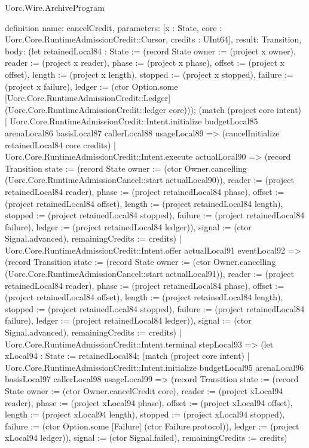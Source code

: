 \begin{lexlean}{Uorc.Wire.ArchiveProgram}
\begin{semanticmodule}
definition{
  name: cancelCredit,
  parameters: [x : State, core : Uorc.Core.RuntimeAdmissionCredit::Cursor, credits : UInt64],
  result: Transition,
  body: (let retainedLocal84 : State := (record State {owner := (project x owner), reader := (project x reader), phase := (project x phase), offset := (project x offset), length := (project x length), stopped := (project x stopped), failure := (project x failure), ledger := (ctor Option.some [Uorc.Core.RuntimeAdmissionCredit::Ledger] (Uorc.Core.RuntimeAdmissionCredit::ledger core))}); (match (project core intent)
    | Uorc.Core.RuntimeAdmissionCredit::Intent.initialize budgetLocal85 arenaLocal86 basisLocal87 callerLocal88 usageLocal89 => (cancelInitialize retainedLocal84 core credits)
    | Uorc.Core.RuntimeAdmissionCredit::Intent.execute actualLocal90 => (record Transition {state := (record State {owner := (ctor Owner.cancelling (Uorc.Core.RuntimeAdmissionCancel::start actualLocal90)), reader := (project retainedLocal84 reader), phase := (project retainedLocal84 phase), offset := (project retainedLocal84 offset), length := (project retainedLocal84 length), stopped := (project retainedLocal84 stopped), failure := (project retainedLocal84 failure), ledger := (project retainedLocal84 ledger)}), signal := (ctor Signal.advanced), remainingCredits := credits})
    | Uorc.Core.RuntimeAdmissionCredit::Intent.offer actualLocal91 eventLocal92 => (record Transition {state := (record State {owner := (ctor Owner.cancelling (Uorc.Core.RuntimeAdmissionCancel::start actualLocal91)), reader := (project retainedLocal84 reader), phase := (project retainedLocal84 phase), offset := (project retainedLocal84 offset), length := (project retainedLocal84 length), stopped := (project retainedLocal84 stopped), failure := (project retainedLocal84 failure), ledger := (project retainedLocal84 ledger)}), signal := (ctor Signal.advanced), remainingCredits := credits})
    | Uorc.Core.RuntimeAdmissionCredit::Intent.terminal stepLocal93 => (let xLocal94 : State := retainedLocal84; (match (project core intent)
      | Uorc.Core.RuntimeAdmissionCredit::Intent.initialize budgetLocal95 arenaLocal96 basisLocal97 callerLocal98 usageLocal99 => (record Transition {state := (record State {owner := (ctor Owner.cancelCredit core), reader := (project xLocal94 reader), phase := (project xLocal94 phase), offset := (project xLocal94 offset), length := (project xLocal94 length), stopped := (project xLocal94 stopped), failure := (ctor Option.some [Failure] (ctor Failure.protocol)), ledger := (project xLocal94 ledger)}), signal := (ctor Signal.failed), remainingCredits := credits})
}
\end{semanticmodule}
\end{lexlean}
